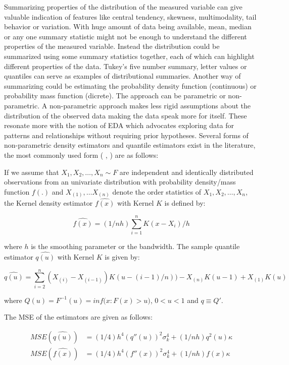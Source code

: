 \documentclass[12pt]{article}
\begin{document}
Summarizing properties of the distribution of the measured variable can give valuable indication of features like central tendency, skewness, multimodality, tail behavior or variation. With huge amount of data being available, mean, median or any one summary statistic might not be enough to understand the different properties of the measured variable. Instead the distribution could be summarized using some summary statistics together, each of which can highlight different properties of the data. Tukey's five number summary, letter values or quantiles can serve as examples of distributional summaries. Another way of summarizing could be estimating the probability density function (continuous) or probability mass function (dicrete). The approach can be parametric or non-parametric. A non-parametric approach makes less rigid assumptions about the distribution of the observed data making the data speak more for itself. These resonate more with the notion of EDA which advocates exploring data for patterns and relationships without requiring prior hypotheses. Several forms of non-parametric density estimators and quantile estimators exist in the literature, the most commonly used form ( \citet{Silverman1986-cl}, \citet{Jones1992-pj}) are as follows:

If we assume that \(X_1, X_2, \dots, X_n \sim F\) are independent and identically distributed observations from an univariate distribution with probability density/mass function \(f(.)\) and \(X_{(1)},\dots X_{(n)}\) denote the order statistics of \(X_1, X_2, \dots, X_n\), the Kernel density estimator \(\hat{f(x)}\) with Kernel \(K\) is defined by:

\begin{equation}
\hat{f(x)} = (1/nh)\sum_{i=1}^{n} K(x-X_i)/h
\end{equation}

where \(h\) is the smoothing parameter or the bandwidth. The sample quantile estimator \(\hat{q(u)}\) with Kernel \(K\) is given by:

\begin{equation}
\hat{q(u)} = \sum_{i=2}^{n}(X_{(i)} - X_{(i-1)})K(u - (i-1)/n)) - X_{(n)}K(u-1) + X_{(1)}K(u)
\end{equation}

where \(Q(u)= F^{-1}(u) = inf({x: F(x) >u)}\), \(0<u< 1\) and \(q \equiv Q'\).

The MSE of the estimators are given as follows:

\begin{equation}\label{eq:MSE}
\begin{split}
MSE(\hat{q(u)}) & = (1/4)h^4(q''(u))^2 \sigma_k^4 + (1/nh)q^2(u) \kappa \\
MSE(\hat{f(x)}) & = (1/4)h^4(f''(x))^2 \sigma_k^4 + (1/nh)f(x) \kappa
\end{split}
\end{equation}
\end{document}
